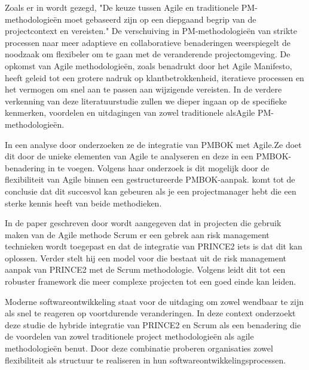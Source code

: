 \documentclass[dutch]{hogent-article}
\begin{document}
Zoals er in \textcite{Demianchuk2020} wordt gezegd, "De keuze tussen Agile en traditionele PM-methodologieën moet gebaseerd zijn op een diepgaand begrip van de projectcontext en vereisten."
De verschuiving in PM-methodologieën van strikte processen naar meer adaptieve en collaboratieve benaderingen weerspiegelt de noodzaak om flexibeler om te gaan met de veranderende projectomgeving. De opkomst van Agile methodologieën, zoals benadrukt door het Agile Manifesto, heeft geleid tot een grotere nadruk op klantbetrokkenheid, iteratieve processen en het vermogen om snel aan te \linebreak passen aan wijzigende vereisten. In de verdere verkenning van deze literatuurstudie zullen we dieper ingaan op de specifieke kenmerken, voordelen en uitdagingen van zowel traditionele als\linebreak Agile PM-methodologieën.\autocite{Demianchuk2020}
\newline
\newline

In een analyse door \textcite{Schwalbe2012ManagingAP} onderzoeken ze de integratie van PMBOK met Agile.Ze doet dit door de unieke elementen van Agile te analyseren en deze in een PMBOK-benadering in te voegen.
Volgens haar onderzoek is dit mogelijk door de flexibiliteit van Agile binnen een gestructureerde PMBOK-aanpak.
\textcite{Schwalbe2012ManagingAP} komt tot de conclusie dat dit succesvol kan gebeuren als je een \newline projectmanager hebt die een sterke kennis heeft van beide methodieken.
\newline

In de paper geschreven door \textcite{Tomnek2015ProjectRM} wordt aangegeven dat in projecten die \newline gebruik maken van de Agile methode Scrum er een gebrek aan risk management technieken wordt toegepast en dat de integratie van PRINCE2 iets is dat dit kan oplossen. Verder stelt hij een model voor die bestaat uit de risk management aanpak van PRINCE2 met de Scrum methodologie.
Volgens \textcite{Tomnek2015ProjectRM} leidt dit tot een robuster framework die meer complexe projecten tot een goed einde kan leiden.
\newline


Moderne softwareontwikkeling staat voor de uitdaging om zowel wendbaar te zijn als snel te \linebreak reageren op voortdurende veranderingen. In deze context onderzoekt deze studie de hybride \linebreak integratie van PRINCE2 en Scrum als een benadering die de voordelen van zowel traditionele project \linebreak methodologieën als agile methodologieën benut. Door deze combinatie proberen organisaties \linebreak zowel flexibiliteit als structuur te realiseren in hun softwareontwikkelingsprocessen.
\newline
\end{document}
